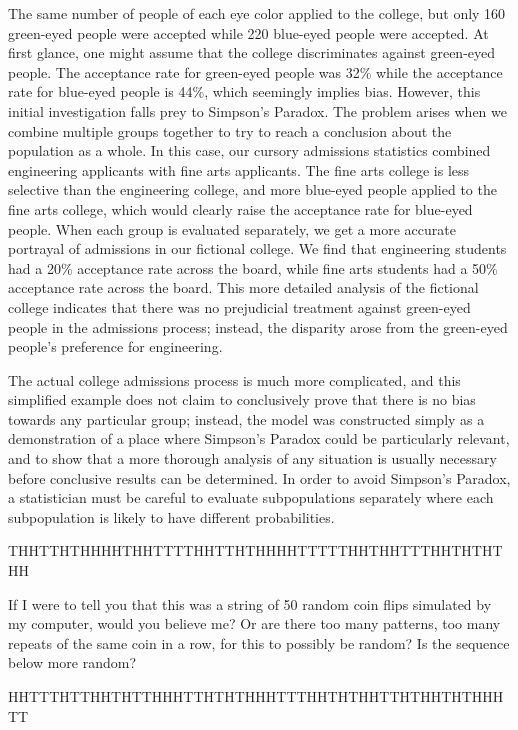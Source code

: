 The same number of people of each eye color applied to the college, but only 160 green-eyed people were accepted while 220 blue-eyed people were accepted. At first glance, one might assume that the college discriminates against green-eyed people. The acceptance rate for green-eyed people was 32\% while the acceptance rate for blue-eyed people is 44\%, which seemingly implies bias. However, this initial investigation falls prey to Simpson’s Paradox. The problem arises when we combine multiple groups together to try to reach a conclusion about the population as a whole. In this case, our cursory admissions statistics combined engineering applicants with fine arts applicants. The fine arts college is less selective than the engineering college, and more blue-eyed people applied to the fine arts college, which would clearly raise the acceptance rate for blue-eyed people. When each group is evaluated separately, we get a more accurate portrayal of admissions in our fictional college. We find that engineering students had a 20\% acceptance rate across the board, while fine arts students had a 50\% acceptance rate across the board. This more detailed analysis of the fictional college indicates that there was no prejudicial treatment against green-eyed people in the admissions process; instead, the disparity arose from the green-eyed people’s preference for engineering.

The actual college admissions process is much more complicated, and this simplified example does not claim to conclusively prove that there is no bias towards any particular group; instead, the model was constructed simply as a demonstration of a place where Simpson’s Paradox could be particularly relevant, and to show that a more thorough analysis of any situation is usually necessary before conclusive results can be determined. In order to avoid Simpson’s Paradox, a statistician must be careful to evaluate subpopulations separately where each subpopulation is likely to have different probabilities.

\begin{center}
    THHTTHTHHHHTHHTTTTHHTTHTHHHHTTTTTHHTHHTTTHHTHTHTHH
\end{center}

If I were to tell you that this was a string of 50 random coin flips simulated by my computer, would you believe me? Or are there too many patterns, too many repeats of the same coin in a row, for this to possibly be random? Is the sequence below more random?

\begin{center}
    HHTTTHTTHHTHTTHHHTTHTHTHHHTTTHHTHTHHTTHTHHTHTHHHTT
\end{center}

